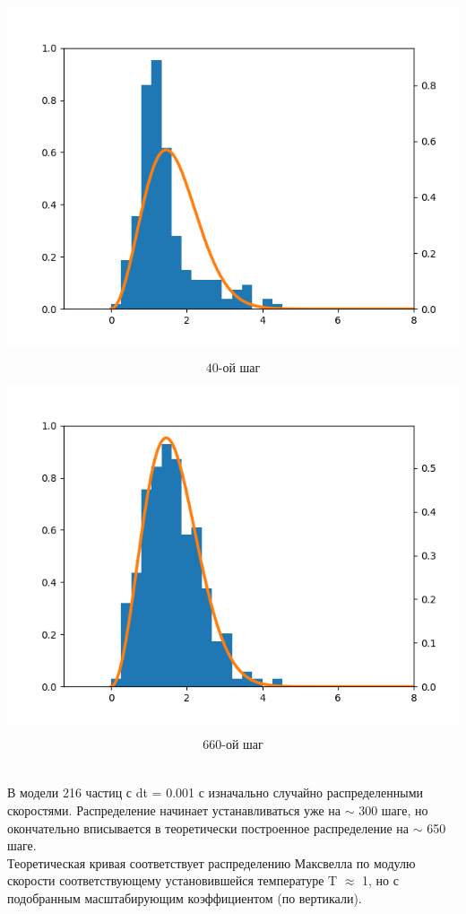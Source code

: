 \documentclass[a4paper, 12pt]{article}
\begin{document}
\begin{center}
\includegraphics[scale=0.8]{40}
\end{center}
\[\textit{40-ой шаг}\]
\begin{center}
\includegraphics[scale=0.8]{660}
\end{center}
\[\textit{660-ой шаг}\]\\\\
В модели 216 частиц с dt = 0.001 с изначально случайно распределенными скоростями. Распределение начинает устанавливаться уже на $\sim$ 300 шаге, но окончательно вписывается в теоретически построенное распределение на $\sim$ 650 шаге.\\
Теоретическая кривая соответствует распределению Максвелла по модулю скорости соответствующему установившейся температуре T $\approx$ 1, но с подобранным масштабирующим коэффициентом (по вертикали).
\end{document}
